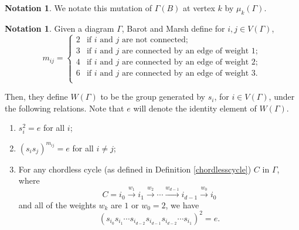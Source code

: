 \documentclass[11pt]{amsart}
\theoremstyle{definition}
\newtheorem{note}[thm]{Notation}
\newcommand\V{V(\Gamma)}
\begin{document}
\begin{note}
We notate this mutation of $\Gamma(B)$ at vertex $k$ by $\mu_k(\Gamma)$. \\
\end{note}

\begin{note}
\label{defn:mij}
\indent Given a diagram $\Gamma$, Barot and Marsh define for $i, j \in \V$,
\begin{displaymath}
m_{ij} = \begin{cases} 2 & \mbox{if } i \mbox{ and } j \mbox{ are not connected;} \\
3 & \mbox{if } i \mbox{ and } j \mbox{ are connected by an edge of weight } 1;\\
4 & \mbox{if } i \mbox{ and } j \mbox{ are connected by an edge of weight } 2;\\
6 & \mbox{if } i \mbox{ and } j \mbox{ are connected by an edge of weight } 3.\\
\end{cases}
\end{displaymath}	
\end{note}

Then, they define $W(\Gamma)$ to be the group generated by $s_i$, for $i \in \V$, under the following relations. Note that $e$ will denote the identity element of $W(\Gamma)$.
\begin{enumerate}
\item $s_i^2 = e$ for all $i$;
\item $(s_is_j)^{m_{ij}} = e$ for all $i \neq j$;
\item For any chordless cycle (as defined in Definition \ref{chordlesscycle}) $C$ in $\Gamma$, where
\begin{displaymath}
C = i_0 \xrightarrow{w_1} i_1 \xrightarrow{w_2} \cdots \xrightarrow{w_{d-1}} i_{d-1} \xrightarrow{w_0} i_0
\end{displaymath}
and all of the weights $w_k$ are $1$ or $w_0 = 2$, we have
\begin{displaymath}
(s_{i_0}s_{i_1}\cdots s_{i_{d-2}}s_{i_{d-1}}s_{i_{d-2}}\cdots s_{i_1})^2 =e.
\end{displaymath}
\end{enumerate}
\end{document}
